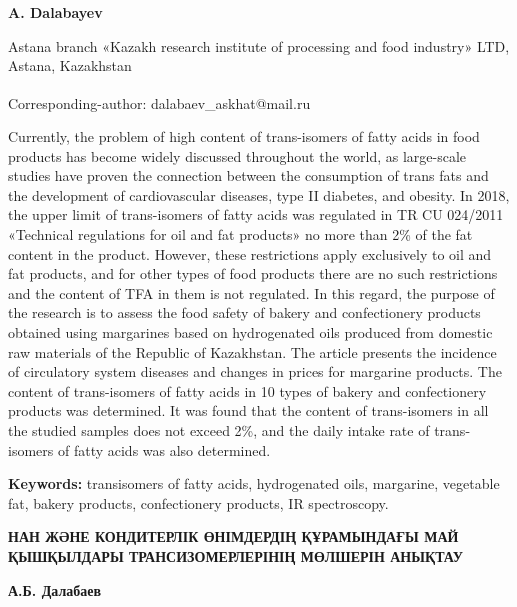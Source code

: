 
\begin{articleheader}

{\bfseries
A. Dalabayev
}
\end{articleheader}

\begin{affiliation}
Astana branch «Kazakh research institute of processing and food
industry» LTD, Astana, Kazakhstan

\raggedright \textsuperscript{\envelope }Corresponding-author: dalabaev\_askhat@mail.ru
\end{affiliation}

Currently, the problem of high content of trans-isomers of fatty acids
in food products has become widely discussed throughout the world, as
large-scale studies have proven the connection between the consumption
of trans fats and the development of cardiovascular diseases, type II
diabetes, and obesity. In 2018, the upper limit of trans-isomers of
fatty acids was regulated in TR CU 024/2011 «Technical regulations for
oil and fat products» no more than 2\% of the fat content in the
product. However, these restrictions apply exclusively to oil and fat
products, and for other types of food products there are no such
restrictions and the content of TFA in them is not regulated. In this
regard, the purpose of the research is to assess the food safety of
bakery and confectionery products obtained using margarines based on
hydrogenated oils produced from domestic raw materials of the Republic
of Kazakhstan. The article presents the incidence of circulatory system
diseases and changes in prices for margarine products. The content of
trans-isomers of fatty acids in 10 types of bakery and confectionery
products was determined. It was found that the content of trans-isomers
in all the studied samples does not exceed 2\%, and the daily intake
rate of trans-isomers of fatty acids was also determined.

{\bfseries Keywords:} transisomers of fatty acids, hydrogenated oils,
margarine, vegetable fat, bakery products, confectionery products, IR
spectroscopy.

\begin{articleheader}
{\bfseries НАН ЖӘНЕ КОНДИТЕРЛІК ӨНІМДЕРДІҢ ҚҰРАМЫНДАҒЫ МАЙ ҚЫШҚЫЛДАРЫ ТРАНСИЗОМЕРЛЕРІНІҢ МӨЛШЕРІН АНЫҚТАУ}

{\bfseries А.Б. Далабаев}
\end{articleheader}


